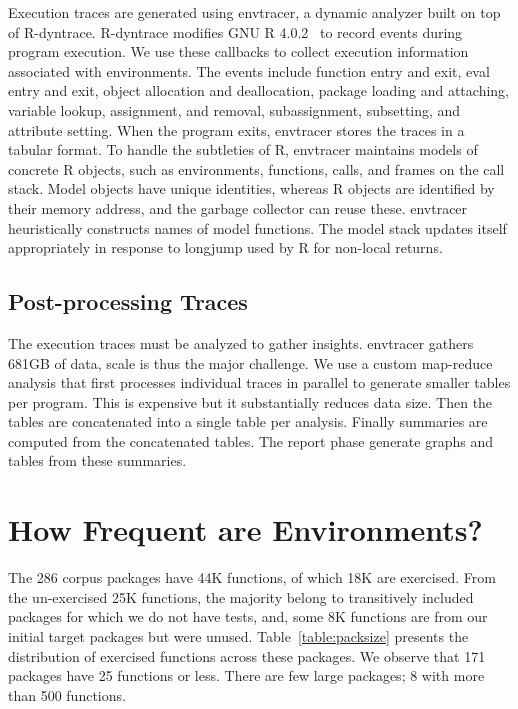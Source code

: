 \documentclass[10pt,review,sigplan,authorversion=true]{acmart}
\newcommand{\envtracer}{{\sf envtracer}\xspace}
\newcommand{\rdyntrace}{{\sf R-dyntrace}\xspace}
\begin{document}
Execution traces are generated using \envtracer, a dynamic analyzer built on top
of \rdyntrace. \rdyntrace modifies GNU R 4.0.2~\cite{oopsla19b} to record events
during program execution. We use these callbacks to collect execution
information associated with environments. The events include function entry and
exit, eval entry and exit, object allocation and deallocation, package loading
and attaching, variable lookup, assignment, and removal, subassignment,
subsetting, and attribute setting. When the program exits, \envtracer stores the
traces in a tabular format. To handle the subtleties of R, \envtracer maintains
models of concrete R objects, such as environments, functions, calls, and frames
on the call stack. Model objects have unique identities, whereas R objects are
identified by their memory address, and the garbage collector can reuse these.
\envtracer heuristically constructs names of model functions. The model stack
updates itself appropriately in response to longjump used by R for non-local
returns.

\subsection{Post-processing Traces}

The execution traces must be analyzed to gather insights. \envtracer gathers
681GB of data, scale is thus the major challenge. We use a custom map-reduce
analysis that first processes individual traces in parallel to generate smaller
tables per program. This is expensive but it substantially reduces data size.
Then the tables are concatenated into a single table per analysis. Finally
summaries are computed from the concatenated tables. The report phase generate
graphs and tables from these summaries.

\section{How Frequent are Environments?}

The 286 corpus packages have 44K functions, of which 18K are exercised. From the
un-exercised 25K functions, the majority belong to transitively included
packages for which we do not have tests, and, some 8K functions are from our
initial target packages but were unused. Table~\ref{table:packsize} presents the
distribution of exercised functions across these packages. We observe that 171
packages have 25 functions or less. There are few large packages; 8 with more
than 500 functions.
\end{document}
